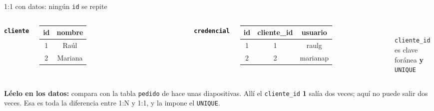 \documentclass[aspectratio=169,10pt,c]{beamer}
\begin{document}
\begin{frame}{1:1 con datos: ningún \texttt{id} se repite}
\begin{columns}[T,onlytextwidth]
\centering
\footnotesize\texttt{\textbf{cliente}}\\[4pt]
\begin{tabular}{cc}
\toprule
\bfseries id & \bfseries nombre \\
\midrule
1 & Raúl \\
2 & Mariana \\
\bottomrule
\end{tabular}
\centering
\footnotesize\texttt{\textbf{credencial}}\\[4pt]
\begin{tabular}{ccc}
\toprule
\bfseries id & \bfseries cliente\_id & \bfseries usuario \\
\midrule
1 & 1 & raulg \\
2 & 2 & marianap \\
\bottomrule
\end{tabular}\\[3pt]
{\scriptsize \texttt{cliente\_id} es clave foránea \textbf{y} \texttt{UNIQUE}}
\end{columns}
\vspace{0.4cm}
\small \textbf{Léelo en los datos:} compara con la tabla \texttt{pedido} de hace unas diapositivas. Allí el \texttt{cliente\_id} \textbf{1} salía dos veces; aquí no puede salir dos veces. Esa es toda la diferencia entre 1:N y 1:1, y la impone el \texttt{UNIQUE}.
\end{frame}
\end{document}
